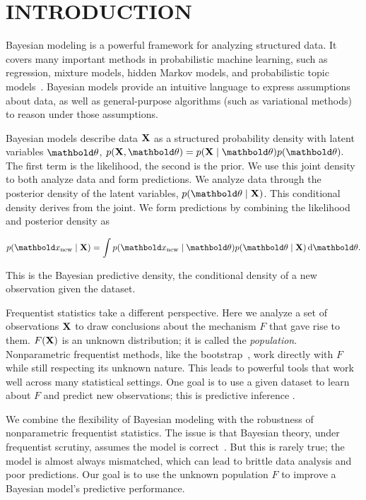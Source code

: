 
\glsresetall{}
\section{INTRODUCTION}

Bayesian modeling is a powerful framework for analyzing
structured data. It covers many important
methods in probabilistic machine learning, such as regression, mixture
models, hidden Markov models, and probabilistic topic
models~\citep{bishop2006pattern,murphy2012machine}.  Bayesian models
provide an intuitive language to express assumptions about data, as well as
general-purpose algorithms (such as variational methods) to
reason under those assumptions.

Bayesian models describe data $\textbf{X}$ as a structured probability
density with latent variables $\mbtheta$,
$p(\mbX, \mbtheta) =  p(\mbX \mid \mbtheta) p(\mbtheta).$
The first term is the likelihood, the second is the prior.  We use
this joint density to both analyze data and form predictions.  We
analyze data through the posterior density of the latent
variables, $p(\mbtheta \mid \mbX)$.  This conditional density
derives from the joint.  We form predictions by combining the
likelihood and posterior density as
\begin{linenomath}
\begin{align}
  p(\xnew \mid \mbX) = \int p(\xnew \mid \mbtheta)
  p(\mbtheta \mid \mbX)
  \dif \mbtheta.
  \label{eq:bayes_predictive}
\end{align}
\end{linenomath}
This is the Bayesian predictive density, the conditional
density of a new observation given the dataset.

Frequentist statistics take a different perspective. Here we analyze a set of
observations $\textbf{X}$ to draw conclusions
about the mechanism $F$ that gave rise to them. $F(\textbf{X})$ is an unknown
distribution; it is called the \emph{population}.
Nonparametric frequentist methods, like the
bootstrap~\citep{efron1994introduction}, work
directly with $F$ while still respecting its unknown nature.  This
leads to powerful tools that work well across many statistical
settings.  One goal is to use a given dataset to learn about $F$ and
predict new observations; this is predictive inference
\citep{young2005essentials}.

 We combine the flexibility of Bayesian
modeling with the robustness of nonparametric frequentist statistics.
The issue is that Bayesian theory, under frequentist
scrutiny, assumes the model is correct~\citep{bernardo2000bayesian}.
But this is rarely true; the model is almost always mismatched, which
can lead to brittle data analysis and poor predictions.
Our goal is to use the unknown population $F$ to improve a
Bayesian model's predictive performance.

